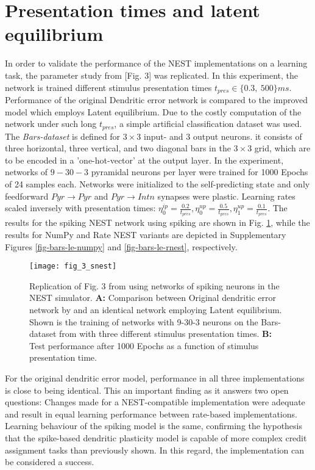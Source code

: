 \section{Presentation times and latent equilibrium}\label{sec-le-tpres}

In order to validate the performance of the NEST implementations on a learning task, the parameter study from
\citep{Haider2021}[Fig. 3] was replicated. In this experiment, the network is trained different stimulus presentation
times $t_{pres} \in \{0.3,\ 500\}ms$. Performance of the original Dendritic error network is compared to the improved
model which employs Latent equilibrium. Due to the costly computation of the network under such long $t_{pres}$, a
simple artificial classification dataset was used. The \textit{Bars-dataset} is defined for $3\times3$ input- and $3$
output neurons. it consists of three horizontal, three vertical, and two diagonal bars in the $3\times3$ grid, which are
to be encoded in a 'one-hot-vector' at the output layer. In the experiment, networks of $9-30-3$ pyramidal neurons per
layer were trained for 1000 Epochs of 24 samples each. Networks were initialized to the self-predicting state and only
feedforward $Pyr\rightarrow Pyr$ and $Pyr \rightarrow Intn$ synapses were plastic. Learning rates scaled inversely with
presentation times: $\eta^{ip}_0 = \frac{0.2}{t_{pres}}, \eta^{up}_0 = \frac{0.5}{t_{pres}}, \eta^{up}_1 =
\frac{0.1}{t_{pres}}$. The results for the spiking NEST network using spiking are shown in Fig. \ref{fig-bars-le-snest},
while the results for NumPy and Rate NEST variants are depicted in Supplementary Figures \ref{fig-bars-le-numpy} and
\ref{fig-bars-le-rnest}, respectively.


\begin{figure}[h]
    \centering
    \texttt{[image: fig\_3\_snest]}
    \caption{Replication of Fig. 3 from \cite{Haider2021} using networks of spiking neurons in the NEST simulator.
        \textbf{A:} Comparison between Original dendritic error network by and an identical network employing Latent
        equilibrium. Shown is the training of networks with 9-30-3 neurons on the Bars-dataset from with three different
        stimulus presentation times. \textbf{B:} Test performance after 1000 Epochs as a function of stimulus
        presentation time.}
    \label{fig-bars-le-snest}
\end{figure}

For the original dendritic error model, performance in all three implementations is close to being identical. This an
important finding as it answers two open questions: Changes made for a NEST-compatible implementation were adequate and
result in equal learning performance between rate-based implementations. Learning behaviour of the spiking model is the
same, confirming the hypothesis that the spike-based dendritic plasticity model is capable of more complex credit
assignment tasks than previously shown. In this regard, the implementation can be considered a success. 

